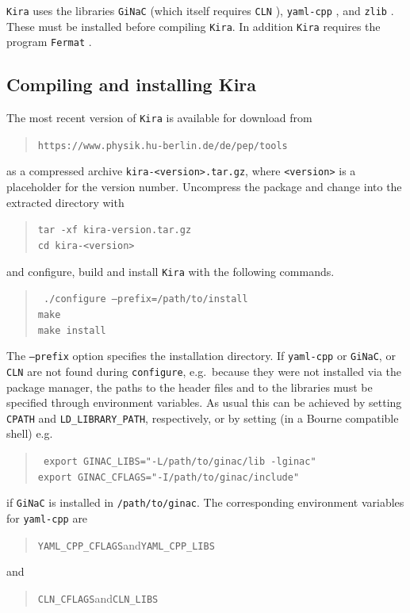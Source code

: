 \documentclass[a4paper,12pt]{scrartcl}
\newcommand*{\kira}{\texttt{Kira}}
\newcommand*{\ginac}{\texttt{GiNaC}}
\newcommand*{\cln}{\texttt{CLN}}
\newcommand*{\zlib}{\texttt{zlib}}
\newcommand*{\yamlcpp}{\texttt{yaml-cpp}}
\newcommand*{\fermat}{\texttt{Fermat}}
\begin{document}
\kira{} uses the libraries \ginac{} \cite{Bauer:2000cp, Vollinga:2005pk} (which
itself requires \cln{} \cite{CLN}), \yamlcpp{} \cite{YAML}, and \zlib{}
\cite{ZLIB}. These must be installed before compiling \kira{}. In addition
\kira{} requires the program \fermat{} \cite{Fermat}.


\subsection{Compiling and installing Kira}
\label{building Kira}

The most recent version of \kira{} is available for download from
\begin{verse}
  \texttt{https://www.physik.hu-berlin.de/de/pep/tools}
\end{verse}
as a compressed archive \texttt{kira-<version>.tar.gz}, where \texttt{<version>} is a
placeholder for the version number. Uncompress the package and change into the
extracted directory with
\begin{verse}
  \texttt{tar -xf kira-version.tar.gz}\\
  \texttt{cd kira-<version>}
\end{verse}
and configure, build and install \kira{} with the following commands.
\begin{verse}
  \texttt{%
    ./configure --prefix=/path/to/install\\
    make\\
    make install
  }
\end{verse}
The \texttt{--prefix} option specifies the installation directory. If \yamlcpp{} or
\ginac{}, or \cln{} are not found during \texttt{configure}, e.g.\ because they were not
installed via the package manager, the paths to the header files and to the
libraries must be specified through environment variables. As usual this can be
achieved by setting \texttt{CPATH} and \texttt{LD\_LIBRARY\_PATH}, respectively, or by
setting (in a Bourne compatible shell) e.g.
\begin{verse}
  \texttt{%
    export GINAC\_LIBS="-L/path/to/ginac/lib -lginac"\\
    export GINAC\_CFLAGS="-I/path/to/ginac/include"
  }
\end{verse}
if \ginac{} is installed in \texttt{/path/to/ginac}. The corresponding environment
variables for \yamlcpp{} are
\begin{verse}
  \texttt{YAML\_CPP\_CFLAGS}\quad and\quad \texttt{YAML\_CPP\_LIBS}
\end{verse}
and
\begin{verse}
  \texttt{CLN\_CFLAGS}\quad and\quad \texttt{CLN\_LIBS}
\end{verse}
\end{document}
